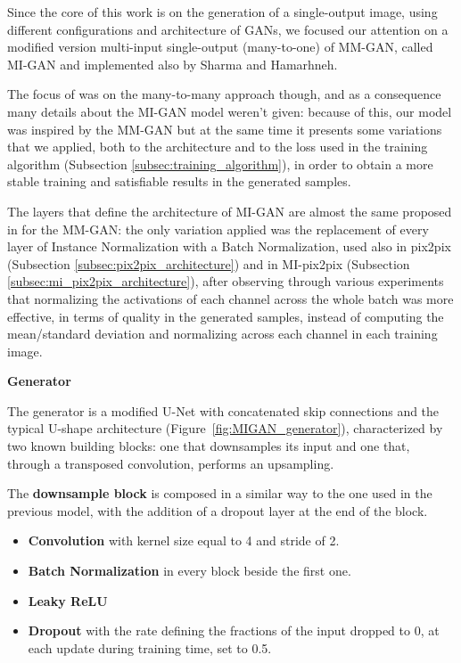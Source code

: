 \vspace{2mm} %
Since the core of this work is on the generation of a single-output image, using different configurations and architecture of \ac{GAN}s, we focused our attention on a modified version multi-input single-output (many-to-one) of MM-GAN, called MI-GAN and implemented also by Sharma and Hamarhneh.

The focus of \cite{migan} was on the many-to-many approach though, and as a consequence many details about the MI-GAN model weren't given: because of this, our model was inspired by the MM-GAN but at the same time it presents some variations that we applied, both to the architecture and to the loss used in the training algorithm (Subsection \ref{subsec:training_algorithm}), in order to obtain a more stable training and satisfiable results in the generated samples.

\vspace{2mm} %
The layers that define the architecture of MI-GAN are almost the same proposed in \cite{migan} for the MM-GAN: the only variation applied was the replacement of every layer of Instance Normalization with a Batch Normalization, used also in pix2pix (Subsection \ref{subsec:pix2pix_architecture}) and in MI-pix2pix (Subsection \ref{subsec:mi_pix2pix_architecture}), after observing through various experiments that normalizing the activations of each channel across the whole batch was more effective, in terms of quality in the generated samples, instead of computing the mean/standard deviation and normalizing across each channel in each training image.

\vspace{6mm} 
\noindent\textbf{Generator}

\vspace{2mm}
\noindent The generator is a modified U-Net with concatenated skip connections and the typical U-shape architecture (Figure~\ref{fig:MIGAN_generator}), characterized by two known building blocks: one that downsamples its input and one that, through a transposed convolution, performs an upsampling. 

The \textbf{downsample block} is composed in a similar way to the one used in the previous model, with the addition of a dropout layer at the end of the block.

\begin{itemize}
\item \textbf{Convolution} with kernel size equal to 4 and stride of 2.
\item \textbf{Batch Normalization} in every block beside the first one.
\item \textbf{Leaky ReLU}
\item \textbf{Dropout} with the rate defining the fractions of the input dropped to 0, at each update during training time, set to 0.5. 
\end{itemize}

